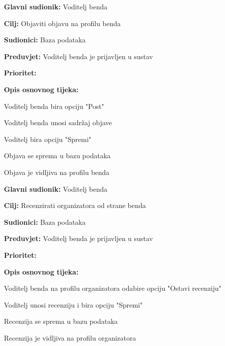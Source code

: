 \noindent {}
	\begin{packed_item}
		
		\item \textbf{Glavni sudionik: } Voditelj benda
		\item \textbf{Cilj:} Objaviti objavu na profilu benda
		\item \textbf{Sudionici:} Baza podataka
		\item \textbf{Preduvjet:} Voditelj benda je prijavljen u sustav
		\item \textbf{Prioritet:} 
		\item \textbf{Opis osnovnog tijeka:} 
		
		\item[] \begin{packed_enum}
			
			\item Voditelj benda bira opciju "Post"
			\item Voditelj benda unosi sadržaj objave
			\item Voditelj bira opciju "Spremi"
			\item Objava se sprema u bazu podataka
			\item Objava je vidljiva na profilu benda
		\end{packed_enum}  
	\end{packed_item}

\noindent {}
	\begin{packed_item}
		
		\item \textbf{Glavni sudionik: } Voditelj benda  
		\item \textbf{Cilj:} Recenzirati organizatora od strane benda
		\item \textbf{Sudionici:} Baza podataka
		\item \textbf{Preduvjet:} Voditelj benda je prijavljen u sustav
		\item \textbf{Prioritet:} 
		\item \textbf{Opis osnovnog tijeka:} 
		
		\item[] \begin{packed_enum}
			
			\item Voditelj benda na profilu organizatora odabire opciju "Ostavi recenziju"
			\item Voditelj unosi recenziju i bira opciju "Spremi"
			\item Recenzija se sprema u bazu podataka
			\item Recenzija je vidljiva na profilu organizatora
		\end{packed_enum}  
	\end{packed_item}


